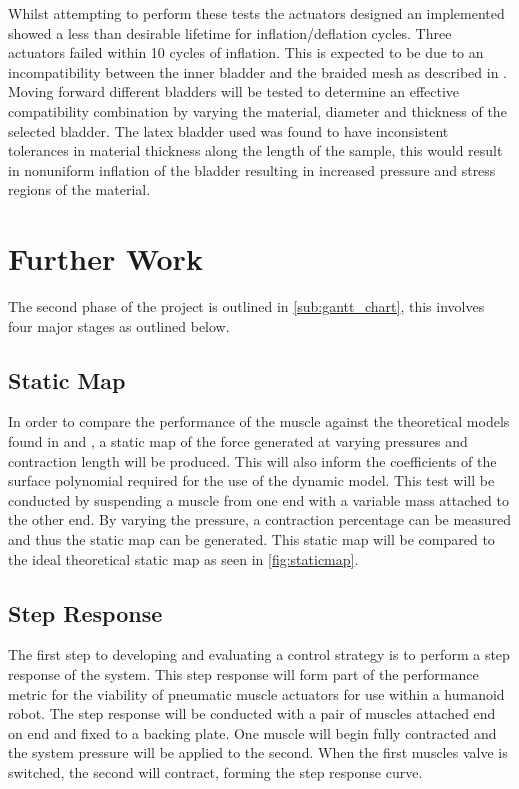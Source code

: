 \documentclass[11pt,a4paper]{article}
\begin{document}
Whilst attempting to perform these tests the actuators designed an implemented showed a less than desirable lifetime for inflation/deflation cycles. Three actuators failed within 10 cycles of inflation. This is expected to be due to an incompatibility between the inner bladder and the braided mesh as described in \cite{andrikopoulos_nikolakopoulos_2017}. Moving forward different bladders will be tested to determine an effective compatibility combination by varying the material, diameter and thickness of the selected bladder. The latex bladder used was found to have inconsistent tolerances in material thickness along the length of the sample, this would result in nonuniform inflation of the bladder resulting in increased pressure and stress regions of the material.

\newpage
\section{Further Work}
\label{sec:further}
The second phase of the project is outlined in \cref{sub:gantt_chart}, this involves four major stages as outlined below.

\subsection{Static Map}
\label{sub:static_map}
In order to compare the performance of the muscle against the theoretical models found in \cite{martens_boblan_2017} and \cite{hosovsky_2012}, a static map of the force generated at varying pressures and contraction length will be produced. This will also inform the coefficients of the surface polynomial required for the use of the dynamic model. This test will be conducted by suspending a muscle from one end with a variable mass attached to the other end. By varying the pressure, a contraction percentage can be measured and thus the static map can be generated. This static map will be compared to the ideal theoretical static map as seen in \cref{fig:staticmap}.

\subsection{Step Response}
\label{sub:step_response}
The first step to developing and evaluating a control strategy is to perform a step response of the system. This step response will form part of the performance metric for the viability of pneumatic muscle actuators for use within a humanoid robot. The step response will be conducted with a pair of muscles attached end on end and fixed to a backing plate. One muscle will begin fully contracted and the system pressure will be applied to the second. When the first muscles valve is switched, the second will contract, forming the step response curve.
\end{document}

